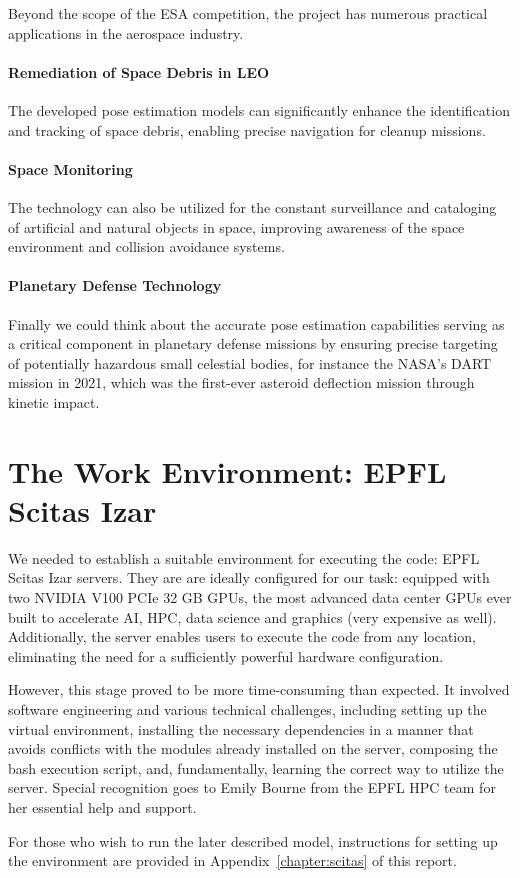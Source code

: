 Beyond the scope of the \ac{ESA} competition, the project has numerous practical applications in the aerospace industry.

\paragraph{Remediation of Space Debris in \ac{LEO}} The developed pose estimation models can significantly enhance the identification and tracking of space debris, enabling precise navigation for cleanup missions.

\paragraph{Space Monitoring} The technology can also be utilized for the constant surveillance and cataloging of artificial and natural objects in space, improving awareness of the space environment and collision avoidance systems.

\paragraph{Planetary Defense Technology} Finally we could think about the accurate pose estimation capabilities serving as a critical component in planetary defense missions by ensuring precise targeting of potentially hazardous small celestial bodies, for instance the NASA’s \ac{DART} mission in 2021, which was the first-ever asteroid deflection mission through kinetic impact.

\section{The Work Environment: EPFL Scitas Izar}

We needed to establish a suitable environment for executing the code: EPFL Scitas Izar servers. They are are ideally configured for our task: equipped with two NVIDIA V100 PCIe 32 GB GPUs, the most advanced data center GPUs ever built to accelerate \ac{AI}, \ac{HPC}, data science and graphics (very expensive as well). Additionally, the server enables users to execute the code from any location, eliminating the need for a sufficiently powerful hardware configuration.

However, this stage proved to be more time-consuming than expected. It involved software engineering and various technical challenges, including setting up the virtual environment, installing the necessary dependencies in a manner that avoids conflicts with the modules already installed on the server, composing the bash execution script, and, fundamentally, learning the correct way to utilize the server. Special recognition goes to Emily Bourne from the EPFL \ac{HPC} team for her essential help and support.

For those who wish to run the later described model, instructions for setting up the environment are provided in Appendix~\ref{chapter:scitas} of this report.
